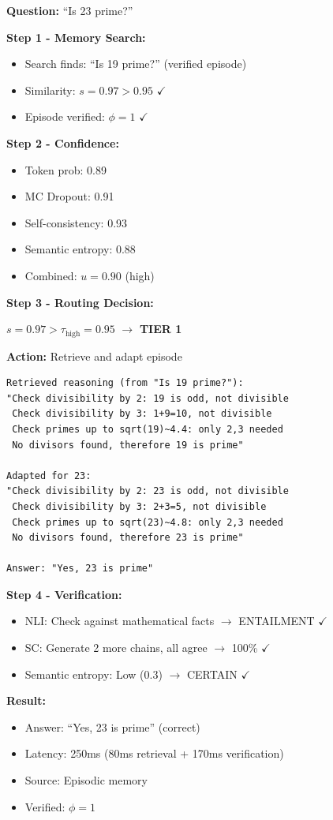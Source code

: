 \documentclass[12pt,a4paper]{article}
\theoremstyle{definition}
\begin{document}
\begin{examplebox}[title=Tier 1: Exact Match Retrieval]

\textbf{Question:} ``Is 23 prime?''

\textbf{Step 1 - Memory Search:}
\begin{itemize}
    \item Search finds: ``Is 19 prime?'' (verified episode)
    \item Similarity: $s = 0.97 > 0.95$ $\checkmark$
    \item Episode verified: $\phi = 1$ $\checkmark$
\end{itemize}

\textbf{Step 2 - Confidence:}
\begin{itemize}
    \item Token prob: 0.89
    \item MC Dropout: 0.91
    \item Self-consistency: 0.93
    \item Semantic entropy: 0.88
    \item Combined: $u = 0.90$ (high)
\end{itemize}

\textbf{Step 3 - Routing Decision:}

$s = 0.97 > \tau_{\text{high}} = 0.95$ $\rightarrow$ \textbf{TIER 1}

\textbf{Action:} Retrieve and adapt episode

\begin{verbatim}
Retrieved reasoning (from "Is 19 prime?"):
"Check divisibility by 2: 19 is odd, not divisible
 Check divisibility by 3: 1+9=10, not divisible
 Check primes up to sqrt(19)~4.4: only 2,3 needed
 No divisors found, therefore 19 is prime"

Adapted for 23:
"Check divisibility by 2: 23 is odd, not divisible
 Check divisibility by 3: 2+3=5, not divisible
 Check primes up to sqrt(23)~4.8: only 2,3 needed
 No divisors found, therefore 23 is prime"

Answer: "Yes, 23 is prime"
\end{verbatim}

\textbf{Step 4 - Verification:}
\begin{itemize}
    \item NLI: Check against mathematical facts $\rightarrow$ ENTAILMENT $\checkmark$
    \item SC: Generate 2 more chains, all agree $\rightarrow$ 100\% $\checkmark$
    \item Semantic entropy: Low (0.3) $\rightarrow$ CERTAIN $\checkmark$
\end{itemize}

\textbf{Result:}
\begin{itemize}
    \item Answer: ``Yes, 23 is prime'' (correct)
    \item Latency: 250ms (80ms retrieval + 170ms verification)
    \item Source: Episodic memory
    \item Verified: $\phi = 1$
\end{itemize}
\end{examplebox}
\end{document}
